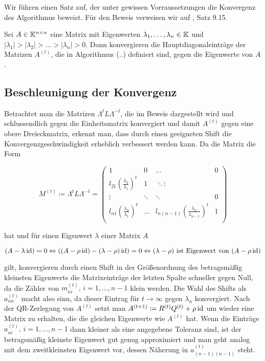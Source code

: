 \documentclass{article}
\begin{document}
Wir führen einen Satz auf, der unter gewissen Vorraussetzungen die Konvergenz des Algorithmus beweist. Für den Beweis verweisen wir auf \cite{Nannen-Skript}, Satz 9.15.

\begin{theorem}
	Sei $A \in \mathbb{K}^{n\times n}$ eine Matrix mit Eigenwerten $\lambda_1,\dots,\lambda_n \in \mathbb{K}$ und $|\lambda_1| > |\lambda_2| > \dots > |\lambda_n| > 0$. Dann konvergieren die Hauptdiagonaleinträge der Matrizen $A^{(t)}$, die in Algorithmus (..) definiert sind, gegen die Eigenwerte von $A$.
\end{theorem}


\subsection{Beschleunigung der Konvergenz}

Betrachtet man die Matrizen $\Lambda^t L \Lambda^{-t}$, die im Beweis dargestellt wird und schlussendlich gegen die Einheitsmatrix konvergiert und damit $A^{(t)}$ gegen eine obere Dreieckmatrix, erkennt man, dass durch einen geeigneten Shift die Konvergenzgeschwindigkeit erheblich verbessert werden kann. Da die Matrix die Form

\begin{equation*}
 	M^{(t)} \coloneqq \Lambda^t L \Lambda^{-t} =
 	\left( \begin{array}{rrrr}
 		1 & 0 & \dots & 0 \\
 		l_{21} \left(\frac{\lambda_2}{\lambda_1}\right)^t & 1 & \ddots \vdots \\
 		\vdots & \ddots & \ddots & 0 \\
 		l_{n1} \left(\frac{\lambda_n}{\lambda_1}\right)^t & \dots & l_{n(n-1)} \left(\frac{\lambda_n}{\lambda_{n-1}}\right)^t & 1 \\
 	\end{array}\right)
\end{equation*}

hat und für einen Eigenwert $\lambda$ einer Matrix $A$

\begin{equation*}
	(A - \lambda \operatorname{id}) = 0 \Leftrightarrow ((A - \rho \operatorname{id}) - (\lambda -\rho) \operatorname{id}) = 0 \Leftrightarrow (\lambda-\rho) \text{ ist Eigenwert von }  (A - \rho \operatorname{id})
\end{equation*}

gilt, konvergieren durch einen Shift in der Größenordnung des betragsmäßig kleinsten Eigenwerts die Matrixeinträge der letzten Spalte schneller gegen Null, da die Zähler von $m^{(t)}_{ni}, \, i = 1,\dots, n-1$ klein werden. Die Wahl des Shifts als $a^{(t)}_{nn}$ macht also sinn, da dieser Eintrag für $t \rightarrow \infty$ gegen $\lambda_n$ konvergiert. Nach der QR-Zerlegung von $A^{(t)}$ setzt man $A^{(t+1)} \coloneqq R^{(t)}Q^{(t)} + \rho \operatorname{id}$ um wieder eine Matrix zu erhalten, die die gleichen Eigenwerte wie $A^{(t)}$ hat.
Wenn die Einträge $a^{(t)}_{ni}, \, i = 1,\dots, n-1$ dann kleiner als eine angegebene Toleranz sind, ist der betragsmäßig kleinste Eigenwert gut genug approximiert und man geht analog mit dem zweitkleinsten Eigenwert vor, dessen Näherung in $a^{(t)}_{(n-1)(n-1)}$ steht.\\
\end{document}
